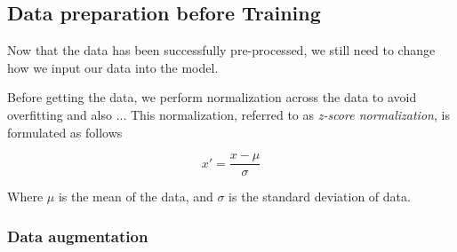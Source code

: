 \subsection{Data preparation before Training} 

Now that the data has been successfully pre-processed, we still need to change how we input our data into the model.

Before getting the data, we perform normalization across the data to avoid overfitting and also ... This normalization, referred to as \textit{z-score normalization}, is formulated as follows

\begin{equation}
    x' = \frac{x - \mu}{\sigma}
\end{equation}

Where $\mu$ is the mean of the data, and $\sigma$ is the standard deviation of data.

\subsubsection{Data augmentation}
